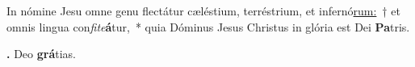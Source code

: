 
In nómine Jesu omne genu flectátur cæléstium, terréstrium, et infernó\-\underline{rum:}~† et omnis lingua con\textit{fite}\textbf{á}tur,~* quia Dóminus Jesus Christus in glória est Dei \textbf{Pa}tris.

\textbf{\Rbar.} Deo \textbf{grá}tias.

